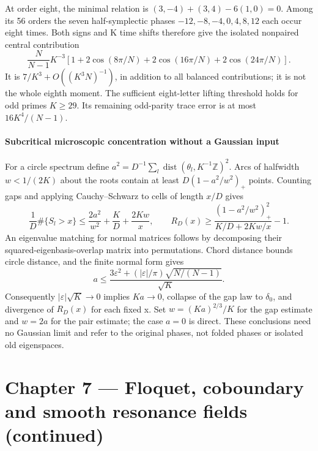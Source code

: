 At order eight, the minimal relation is
$(3,-4)+(3,4)-6(1,0)=0$. Among its 56 orders the seven half-symplectic phases
$-12,-8,-4,0,4,8,12$ each occur eight times. Both signs and K time shifts
therefore give the isolated nonpaired central contribution
\[
 \frac{N}{N-1}K^{-3}
  [1+2\cos(8\pi/N)+2\cos(16\pi/N)+2\cos(24\pi/N)].
\]
It is $7/K^3+O((K^3N)^{-1})$, in addition to all balanced contributions;
it is not the whole eighth moment. The sufficient eight-letter lifting
threshold holds for odd primes $K\geq29$. Its remaining odd-parity trace
error is at most $16K^4/(N-1)$.

\subsection{Subcritical microscopic concentration without a Gaussian input}
For a circle spectrum define $a^2=D^{-1}\sum_l\operatorname{dist}
(\theta_l,K^{-1}\mathbb Z)^2$. Arcs of halfwidth $w<1/(2K)$ about the roots
contain at least $D(1-a^2/w^2)_+$ points. Counting gaps and applying
Cauchy--Schwarz to cells of length $x/D$ gives
\[
 \frac1D\#\{S_l>x\}\leq\frac{2a^2}{w^2}+\frac KD+\frac{2Kw}{x},
 \qquad
 R_D(x)\geq\frac{(1-a^2/w^2)_+^2}{K/D+2Kw/x}-1.
\]
An eigenvalue matching for normal matrices follows by decomposing their
squared-eigenbasis-overlap matrix into permutations. Chord distance bounds
circle distance, and the finite normal form gives
\[
 a\leq\frac{3\varepsilon^2+
            (|\varepsilon|/\pi)\sqrt{N/(N-1)}}{\sqrt K}.
\]
Consequently $|\varepsilon|\sqrt K\to0$ implies $Ka\to0$, collapse of the
gap law to $\delta_0$, and divergence of $R_D(x)$ for each fixed x. Set
$w=(Ka)^{2/3}/K$ for the gap estimate and $w=2a$ for the pair estimate;
the case $a=0$ is direct. These conclusions need no Gaussian limit and
refer to the original phases, not folded phases or isolated old eigenspaces.

\part*{Chapter 7 --- Floquet, coboundary and smooth resonance fields (continued)}

